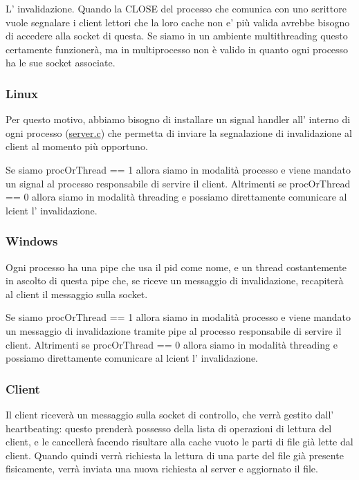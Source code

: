 L' invalidazione. Quando la C\+L\+O\+S\+E del processo che comunica con uno scrittore vuole segnalare i client lettori che la loro cache non e' più valida avrebbe bisogno di accedere alla socket di questa. Se siamo in un ambiente multithreading questo certamente funzionerà, ma in multiprocesso non è valido in quanto ogni processo ha le sue socket associate.

\subsubsection*{Linux}

Per questo motivo, abbiamo bisogno di installare un signal handler all' interno di ogni processo (\hyperlink{server_8c}{server.\+c}) che permetta di inviare la segnalazione di invalidazione al client al momento più opportuno.

Se siamo proc\+Or\+Thread == 1 allora siamo in modalità processo e viene mandato un signal al processo responsabile di servire il client. Altrimenti se proc\+Or\+Thread == 0 allora siamo in modalità threading e possiamo direttamente comunicare al lcient l' invalidazione.

\subsubsection*{Windows}

Ogni processo ha una pipe che usa il pid come nome, e un thread costantemente in ascolto di questa pipe che, se riceve un messaggio di invalidazione, recapiterà al client il messaggio sulla socket.

Se siamo proc\+Or\+Thread == 1 allora siamo in modalità processo e viene mandato un messaggio di invalidazione tramite pipe al processo responsabile di servire il client. Altrimenti se proc\+Or\+Thread == 0 allora siamo in modalità threading e possiamo direttamente comunicare al lcient l' invalidazione.

\subsubsection*{Client}

Il client riceverà un messaggio sulla socket di controllo, che verrà gestito dall' heartbeating\+: questo prenderà possesso della lista di operazioni di lettura del client, e le cancellerà facendo risultare alla cache vuoto le parti di file già lette dal client. Quando quindi verrà richiesta la lettura di una parte del file già presente fisicamente, verrà inviata una nuova richiesta al server e aggiornato il file. 